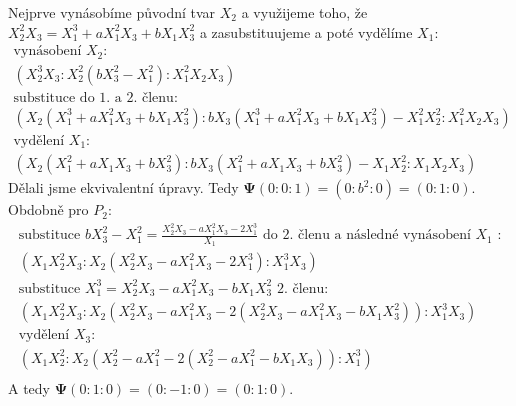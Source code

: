 \documentclass[12pt, a4paper]{article}
\begin{document}
\begin{enumerate}
    Nejprve vynásobíme původní tvar $X_2$ a využijeme toho, že $X_2^2X_3 = X_1^3+aX_1^2X_3 + bX_1X_3^2$ a zasubstituujeme a poté vydělíme $X_1$:
    \begin{gather*}
    \text{vynásobení $X_2$:}\\
    (X_2^3X_3 : X_2^2(bX_3^2-X_1^2) : X_1^2X_2X_3)\\
    \text{substituce do 1. a 2. členu:}\\
    (X_2(X_1^3+aX_1^2X_3 + bX_1X_3^2) : bX_3(X_1^3+aX_1^2X_3 + bX_1X_3^2) - X_1^2X_2^2 : X_1^2X_2X_3)\\
    \text{vydělení $X_1$:}\\
    (X_2(X_1^2+aX_1X_3 + bX_3^2) : bX_3(X_1^2+aX_1X_3 + bX_3^2) - X_1X_2^2 : X_1X_2X_3)
    \end{gather*}
    Dělali jsme ekvivalentní úpravy. Tedy $\mathbf{\Psi}(0:0:1) = (0:b^2:0) = (0:1:0)$. Obdobně pro $P_2$:
    \begin{gather*}
    \text{substituce $bX_3^2-X_1^2 = \frac{X_2^2X_3-aX_1^2X_3-2X_1^3}{X_1}$ do 2. členu a následné vynásobení $X_1$ :}\\
    (X_1X_2^2X_3 : X_2(X_2^2X_3-aX_1^2X_3-2X_1^3) : X_1^3X_3)\\
    \text{substituce $X_1^3 = X_2^2X_3 - aX_1^2X_3 - bX_1X_3^2$ 2. členu:}\\
    (X_1X_2^2X_3 : X_2(X_2^2X_3-aX_1^2X_3-2(X_2^2X_3 - aX_1^2X_3 - bX_1X_3^2)) : X_1^3X_3)\\
    \text{vydělení $X_3$:}\\
    (X_1X_2^2 : X_2(X_2^2-aX_1^2-2(X_2^2 - aX_1^2 - bX_1X_3)) : X_1^3)\\
    \end{gather*}
    A tedy $\mathbf{\Psi}(0:1:0) = (0:-1:0) = (0:1:0)$.
\end{enumerate}
\end{document}
